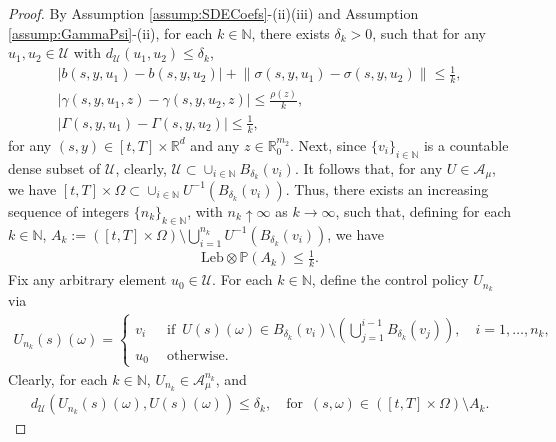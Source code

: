 \documentclass[amscd,amssymb,11pt]{article}
\numberwithin{theorem}{section}
\numberwithin{equation}{section}
\begin{document}
\begin{proof}
By Assumption \ref{assump:SDECoefs}-(ii)(iii) and Assumption \ref{assump:GammaPsi}-(ii), for each $k\in\mathbb{N}$, there exists $\delta_{k}>0$, such that for any $u_{1},u_{2}\in\mathcal{U}$ with $d_{\mathcal{U}}(u_{1},u_{2})\leq\delta_{k}$,
\begin{align}\label{eq:EstDiffbsigmaU}
\left|b(s,y,u_{1})-b(s,y,u_{2})\right|+\left\|\sigma(s,y,u_{1})-\sigma(s,y,u_{2})\right\|\leq\frac{1}{k},\\
\label{eq:EstDiffgammaU} \left|\gamma(s,y,u_{1},z)-\gamma(s,y,u_{2},z)\right|\leq\frac{\rho(z)}{k},\qquad\quad\,\,\,\,\\
\label{eq:EstDiffGammaU} \left|\Gamma(s,y,u_{1})-\Gamma(s,y,u_{2})\right|\leq\frac{1}{k},\qquad\qquad\quad\,
\end{align}
for any $(s,y)\in[t,T]\times\mathbb{R}^{d}$ and any $z\in\mathbb{R}^{m_{2}}_{0}$. Next, since $\{v_{i}\}_{i\in\mathbb{N}}$ is a countable dense subset of $\mathcal{U}$, clearly, $\mathcal{U}\subset\cup_{i\in\mathbb{N}}B_{\delta_{k}}(v_{i})$. It follows that, for any $U\in\mathcal{A}_{\mu}$, we have $[t,T]\times\Omega\subset\cup_{i\in\mathbb{N}}U^{-1}(B_{\delta_{k}}(v_{i}))$. Thus, there exists an increasing sequence of integers $\{n_{k}\}_{k\in\mathbb{N}}$, with $n_{k}\uparrow\infty$ as $k\rightarrow\infty$, such that, defining for each $k\in\mathbb{N}$, $A_{k}:=([t,T]\times\Omega)\setminus\bigcup_{i=1}^{n_{k}}U^{-1}(B_{\delta_{k}}(v_{i}))$, we have
\begin{align*}
\text{Leb}\otimes\mathbb{P}\left(A_{k}\right)\leq\frac{1}{k}.
\end{align*}
Fix any arbitrary element $u_{0}\in\mathcal{U}$. For each $k\in\mathbb{N}$, define the control policy $U_{n_{k}}$ via
\begin{align*}
U_{n_{k}}(s)(\omega)=\left\{\begin{array}{ll} v_{i} &\,\,\,\text{if }\,U(s)(\omega)\in B_{\delta_{k}}(v_{i})\setminus\left(\bigcup_{j=1}^{i-1}B_{\delta_{k}}(v_{j})\right),\quad i=1,\ldots,n_{k}, \\ u_{0} &\,\,\,\text{otherwise}. \end{array}\right.
\end{align*}
Clearly, for each $k\in\mathbb{N}$, $U_{n_{k}}\in\mathcal{A}_{\mu}^{n_{k}}$, and
\begin{align*}
d_{\mathcal{U}}\left(U_{n_{k}}(s)(\omega),U(s)(\omega)\right)\leq\delta_{k},\quad\text{for }\,(s,\omega)\in ([t,T]\times\Omega)\setminus A_{k}.
\end{align*}

\end{proof}
\end{document}
